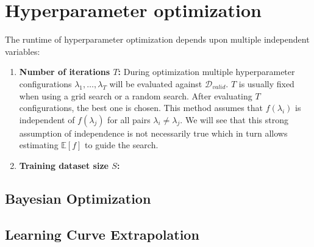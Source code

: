 
\section{Hyperparameter optimization}%
\label{sec:hyperparams}

The runtime of hyperparameter optimization depends upon multiple independent variables:
\begin{enumerate}
	\item \textbf{Number of iterations \(T\):}
		During optimization multiple hyperparameter configurations \(\lambda_1, \dots, \lambda_T\) will be evaluated against \(\mathcal{D}_{\mathit{valid}}\).
		\(T\) is usually fixed when using a grid search or a random search.
		After evaluating \(T\) configurations, the best one is chosen.
		This method assumes that \(f(\lambda_i)\) is independent of \(f(\lambda_j)\) for all pairs \(\lambda_i \neq \lambda_j\).
		We will see that this strong assumption of independence is not necessarily true which in turn allows estimating \(\mathbb{E}[f]\) to guide the search.
	\item \textbf{Training dataset size \(S\):}
\end{enumerate}

\subsection{Bayesian Optimization}%
\label{sec:hyperparams:fabolas}

\subsection{Learning Curve Extrapolation}%
\label{sec:hyperparams:earlyterm}
